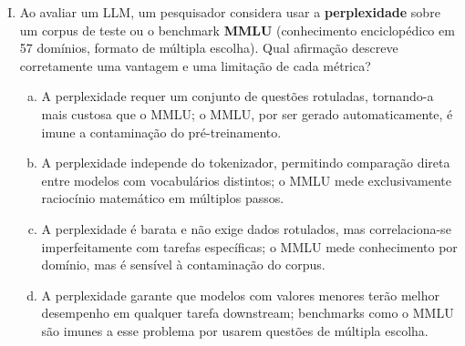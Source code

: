 \documentclass{dlproblemset}
\begin{document}
\begin{enumerate}[I)]
Qual afirmação descreve corretamente o efeito da temperatura?

\begin{enumerate}[a)]
    \item $T < 1$ achata a distribuição, aumentando a diversidade;
          $T > 1$ concentra a massa no token mais provável.
    \item $T = 1$ produz distribuição uniforme; valores maiores
          concentram a massa progressivamente.
    \item $T \to 0$ equivale ao argmax (greedy); $T > 1$ achata a
          distribuição, aumentando a diversidade da geração.
    \item A temperatura não altera as razões de probabilidade entre
          tokens: se $P(v_i)/P(v_j) = r$ com $T{=}1$, essa razão
          permanece $r$ para qualquer valor de $T$.
\end{enumerate}

\item Ao avaliar um LLM, um pesquisador considera usar a
      \textbf{perplexidade} sobre um corpus de teste ou o benchmark
      \textbf{MMLU} (conhecimento enciclopédico em 57 domínios,
      formato de múltipla escolha). Qual afirmação descreve
      corretamente uma vantagem e uma limitação de cada métrica?

\begin{enumerate}[a)]
    \item A perplexidade requer um conjunto de questões rotuladas,
          tornando-a mais custosa que o MMLU; o MMLU, por ser gerado
          automaticamente, é imune a contaminação do pré-treinamento.
    \item A perplexidade independe do tokenizador, permitindo
          comparação direta entre modelos com vocabulários distintos;
          o MMLU mede exclusivamente raciocínio matemático em
          múltiplos passos.
    \item A perplexidade é barata e não exige dados rotulados, mas
          correlaciona-se imperfeitamente com tarefas específicas;
          o MMLU mede conhecimento por domínio, mas é sensível à
          contaminação do corpus.
    \item A perplexidade garante que modelos com valores menores
          terão melhor desempenho em qualquer tarefa downstream;
          benchmarks como o MMLU são imunes a esse problema por
          usarem questões de múltipla escolha.
\end{enumerate}


\end{enumerate}
\end{document}
